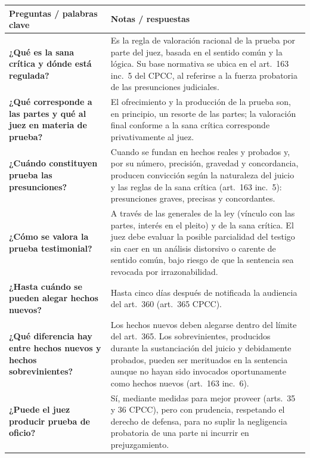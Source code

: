 \documentclass[12pt,oneside]{book}
\begin{document}
\begin{longtable}{@{}>{\raggedright\arraybackslash}p{}>{\raggedright\arraybackslash}p{}@{}}
\toprule
\textbf{Preguntas / palabras clave} & \textbf{Notas / respuestas} \\
\midrule
\endhead

\textbf{¿Qué es la sana crítica y dónde está regulada?} &
Es la regla de valoración racional de la prueba por parte del juez, basada en el sentido común y la lógica. Su base normativa se ubica en el art.\ 163 inc.\ 5 del CPCC, al referirse a la fuerza probatoria de las presunciones judiciales. \\[0.6em]

\textbf{¿Qué corresponde a las partes y qué al juez en materia de prueba?} &
El ofrecimiento y la producción de la prueba son, en principio, un resorte de las partes; la valoración final conforme a la sana crítica corresponde privativamente al juez. \\[0.6em]

\textbf{¿Cuándo constituyen prueba las presunciones?} &
Cuando se fundan en hechos reales y probados y, por su número, precisión, gravedad y concordancia, producen convicción según la naturaleza del juicio y las reglas de la sana crítica (art.\ 163 inc.\ 5): presunciones graves, precisas y concordantes. \\[0.6em]

\textbf{¿Cómo se valora la prueba testimonial?} &
A través de las generales de la ley (vínculo con las partes, interés en el pleito) y de la sana crítica. El juez debe evaluar la posible parcialidad del testigo sin caer en un análisis distorsivo o carente de sentido común, bajo riesgo de que la sentencia sea revocada por irrazonabilidad. \\[0.6em]

\textbf{¿Hasta cuándo se pueden alegar hechos nuevos?} &
Hasta cinco días después de notificada la audiencia del art.\ 360 (art.\ 365 CPCC). \\[0.6em]

\textbf{¿Qué diferencia hay entre hechos nuevos y hechos sobrevinientes?} &
Los hechos nuevos deben alegarse dentro del límite del art.\ 365. Los sobrevinientes, producidos durante la sustanciación del juicio y debidamente probados, pueden ser merituados en la sentencia aunque no hayan sido invocados oportunamente como hechos nuevos (art.\ 163 inc.\ 6). \\[0.6em]

\textbf{¿Puede el juez producir prueba de oficio?} &
Sí, mediante medidas para mejor proveer (arts.\ 35 y 36 CPCC), pero con prudencia, respetando el derecho de defensa, para no suplir la negligencia probatoria de una parte ni incurrir en prejuzgamiento. \\


\end{longtable}
\end{document}
